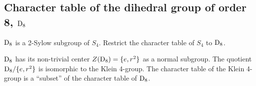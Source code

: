 \subsection{Character table of the dihedral group of order 8, $\text{D}_8$}

$\text{D}_8$ is a 2-Sylow subgroup of $S_4$. Restrict the character table of $S_4$ to $\text{D}_8$. 

$\text{D}_8$ has its non-trivial                                                                                                                                                                                                                                                              center $Z(\text{D}_8) = \{e, r^2\}$ as a normal subgroup. The quotient $\text{D}_8/\{e, r^2\}$ is isomorphic to the Klein 4-group. The character table of the Klein 4-group is a ``subset'' of the character table of $\text{D}_8$.